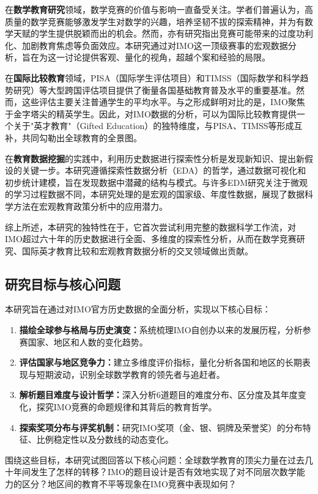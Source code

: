\documentclass[12pt,a4paper]{article}
\begin{document}
在\textbf{数学教育研究}领域，数学竞赛的价值与影响一直备受关注。学者们普遍认为，高质量的数学竞赛能够激发学生对数学的兴趣，培养坚韧不拔的探索精神，并为有数学天赋的学生提供脱颖而出的机会\cite{mathematics_competition_research,competition_mathematics_education}。然而，亦有研究指出竞赛可能带来的过度功利化、加剧教育焦虑等负面效应。本研究通过对IMO这一顶级赛事的宏观数据分析，旨在为这一讨论提供客观、量化的视角，超越个案和经验的局限。

在\textbf{国际比较教育}领域，PISA（国际学生评估项目）和TIMSS（国际数学和科学趋势研究）等大型跨国评估项目提供了衡量各国基础教育普及水平的重要基准\cite{pisa_mathematics,timss_trends}。然而，这些评估主要关注普通学生的平均水平。与之形成鲜明对比的是，IMO聚焦于金字塔尖的精英学生。因此，对IMO数据的分析，可以为国际比较教育提供一个关于"英才教育"（Gifted Education）的独特维度，与PISA、TIMSS等形成互补，共同勾勒出全球教育的全景图\cite{international_comparative_education,gifted_mathematics_education}。

在\textbf{教育数据挖掘}的实践中，利用历史数据进行探索性分析是发现新知识、提出新假设的关键一步。本研究遵循探索性数据分析（EDA）的哲学\cite{tukey1977exploratory}，通过数据可视化和初步统计建模，旨在发现数据中潜藏的结构与模式。与许多EDM研究关注于微观的学习过程数据不同，本研究处理的是宏观的国家级、年度性数据，展现了数据科学方法在宏观教育政策分析中的应用潜力。

综上所述，本研究的独特性在于，它首次尝试利用完整的数据科学工作流，对IMO超过六十年的历史数据进行全面、多维度的探索性分析，从而在数学竞赛研究、国际英才教育比较和宏观教育数据分析的交叉领域做出贡献。

\subsection{研究目标与核心问题}
本研究旨在通过对IMO官方历史数据的全面分析，实现以下核心目标：
\begin{enumerate}
    \item \textbf{描绘全球参与格局与历史演变：}系统梳理IMO自创办以来的发展历程，分析参赛国家、地区和人数的变化趋势。
    \item \textbf{评估国家与地区竞争力：}建立多维度评价指标，量化分析各国和地区的长期表现与短期波动，识别全球数学教育的领先者与追赶者。
    \item \textbf{解析题目难度与设计哲学：}深入分析6道题目的难度分布、区分度及其年度变化，探究IMO竞赛的命题规律和其背后的教育哲学。
    \item \textbf{探索奖项分布与评奖机制：}研究IMO奖项（金、银、铜牌及荣誉奖）的分布特征、比例稳定性以及分数线的动态变化。
\end{enumerate}
围绕这些目标，本研究试图回答以下核心问题：全球数学教育的顶尖力量在过去几十年间发生了怎样的转移？IMO的题目设计是否有效地实现了对不同层次数学能力的区分？地区间的教育不平等现象在IMO竞赛中表现如何？
\end{document}

